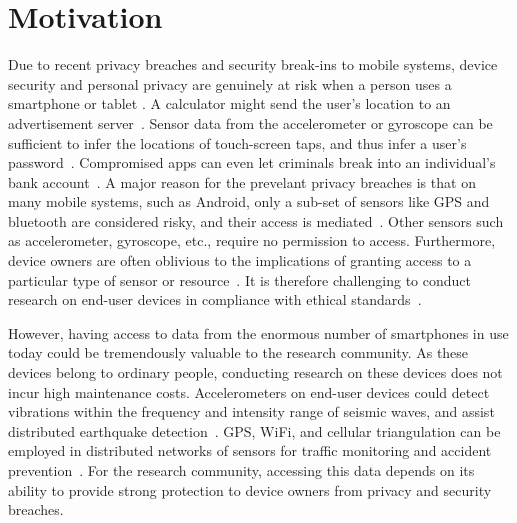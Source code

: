 \section{Motivation}\label{sec-motivation}

Due to recent privacy breaches and security break-ins to mobile systems, 
device security and personal privacy are genuinely at risk when a person 
uses a smartphone or tablet \cite{breach}. 
A calculator might send the user's location to an advertisement 
server~\cite{calc}. Sensor data from the accelerometer 
or gyroscope can be sufficient to infer the locations of touch-screen 
taps, and thus infer a user's password~\cite{cai2011touchlogger}.
Compromised apps can even let criminals break into an individual's 
bank account~\cite{starbucks}. 
A major reason for the prevelant privacy breaches is that on many mobile 
systems, such as Android, 
only a sub-set of sensors like GPS and bluetooth are considered risky, 
and their access is mediated~\cite{android-sec}. Other sensors 
such as accelerometer, gyroscope, etc., 
require no permission to access. Furthermore, %
device owners are often oblivious to the implications of granting access to
a particular type of sensor or resource~\cite{felt2012android}. It is 
therefore challenging to conduct research on end-user devices
in compliance with ethical standards~\cite{zevenbergen2013ethical}.

However, having access to data from the enormous number of smartphones 
in use today could be tremendously valuable to the research 
community. As these devices belong to ordinary people, conducting
research on these devices does not incur high maintenance costs. 
Accelerometers on end-user devices could detect vibrations within 
the frequency and intensity range of seismic waves, and assist 
distributed earthquake detection~\cite{faulkner2011next}. GPS, 
WiFi, and cellular triangulation can be employed in distributed 
networks of sensors for traffic monitoring and accident 
prevention~\cite{mohan2008nericell, thiagarajan2009vtrack}. 
For the research community, accessing this data depends on its 
ability to provide strong protection to device owners from privacy 
and security breaches.

